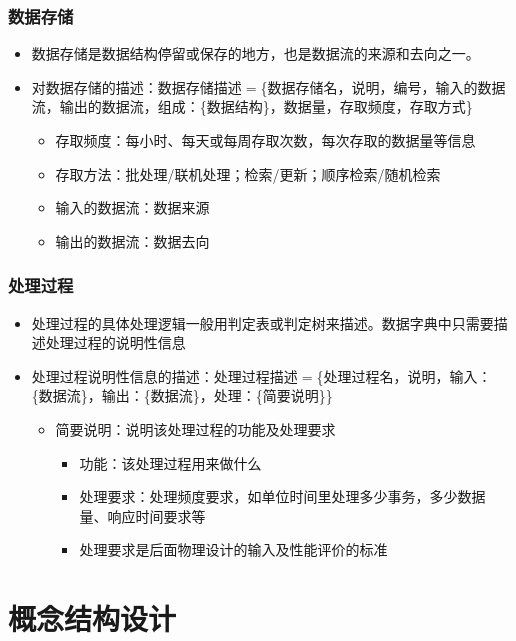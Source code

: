 \subsubsection{数据存储}
\begin{itemize}
    \item 数据存储是数据结构停留或保存的地方，也是数据流的来源和去向之一。
    \item 对数据存储的描述：数据存储描述$=$\{数据存储名，说明，编号，输入的数据流，输出的数据流，组成：\{数据结构\}，数据量，存取频度，存取方式\}
    \begin{itemize}
        \item 存取频度：每小时、每天或每周存取次数，每次存取的数据量等信息 
        \item 存取方法：批处理/联机处理；检索/更新；顺序检索/随机检索
        \item 输入的数据流：数据来源
        \item 输出的数据流：数据去向
    \end{itemize}
\end{itemize}

\subsubsection{处理过程}
\begin{itemize}
    \item 处理过程的具体处理逻辑一般用判定表或判定树来描述。数据字典中只需要描述处理过程的说明性信息
    \item 处理过程说明性信息的描述：处理过程描述$=$\{处理过程名，说明，输入：\{数据流\}，输出：\{数据流\}，处理：\{简要说明\}\}
    \begin{itemize}
        \item 简要说明：说明该处理过程的功能及处理要求
        \begin{itemize}
            \item 功能：该处理过程用来做什么
            \item 处理要求：处理频度要求，如单位时间里处理多少事务，多少数据量、响应时间要求等
            \item 处理要求是后面物理设计的输入及性能评价的标准
        \end{itemize}
    \end{itemize}
\end{itemize}

\section{概念结构设计}

